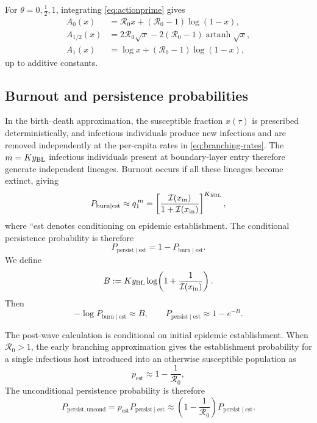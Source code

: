 \documentclass[11pt]{article}
\newcommand{\Rzero}{\mathcal R_0}
\newcommand{\yin}{y_{\rm BL}}
\newcommand{\xin}{x_{\rm in}}
\newcommand{\est}{\mathrm{est}}
\newcommand{\burn}{\mathrm{burn}}
\newcommand{\persist}{\mathrm{persist}}
\newcommand{\uncond}{\mathrm{uncond}}
\begin{document}
For \(\theta=0,\tfrac12,1\), integrating \cref{eq:actionprime} gives
\begin{align}
A_0(x)&=\Rzero x+(\Rzero-1)\log(1-x),\\
A_{1/2}(x)&=2\Rzero\sqrt{x}-2(\Rzero-1)\operatorname{artanh}\sqrt{x},\\
A_1(x)&=\log x+(\Rzero-1)\log(1-x),
\end{align}
up to additive constants.

\subsection{Burnout and persistence probabilities}
In the birth--death approximation, the susceptible fraction \(x(\tau)\) is prescribed deterministically, and infectious individuals produce new infections and are removed independently at the per-capita rates in \cref{eq:branching-rates}. The \(m=K\yin\) infectious individuals present at boundary-layer entry therefore generate independent lineages. Burnout occurs if all these lineages become extinct, giving
\begin{equation}
P_{\burn\mid\est}\approx q_1^{\,m}
=\left[\frac{\mathcal{I}(\xin)}{1+\mathcal{I}(\xin)}\right]^{K\yin},
\label{eq:Pburn}
\end{equation}
where ``est denotes conditioning on epidemic establishment.
The conditional persistence probability is therefore
\begin{equation}
P_{\persist\mid\est}=1-P_{\burn\mid\est}.
\label{eq:Ppersistcond}
\end{equation}
We define
\begin{equation}
B:=K\yin\log\!\left(1+\frac{1}{\mathcal{I}(\xin)}\right).
\label{eq:B}
\end{equation}
Then
\[
-\log P_{\burn\mid\est}\approx B,
\qquad
P_{\persist\mid\est}\approx1-e^{-B}.
\]

The post-wave calculation is conditional on initial epidemic establishment. When \(\Rzero>1\), the early branching approximation gives the establishment probability for a single infectious host introduced into an otherwise susceptible population as \cite{Whittle1955}
\begin{equation}
p_{\est}\approx1-\frac{1}{\Rzero},
\label{eq:pest}
\end{equation}
The unconditional persistence probability is therefore
\begin{equation}
P_{\persist,\uncond}
=p_{\est}P_{\persist\mid\est}
\approx\left(1-\frac{1}{\Rzero}\right)P_{\persist\mid\est}.
\label{eq:uncond}
\end{equation}
\end{document}
